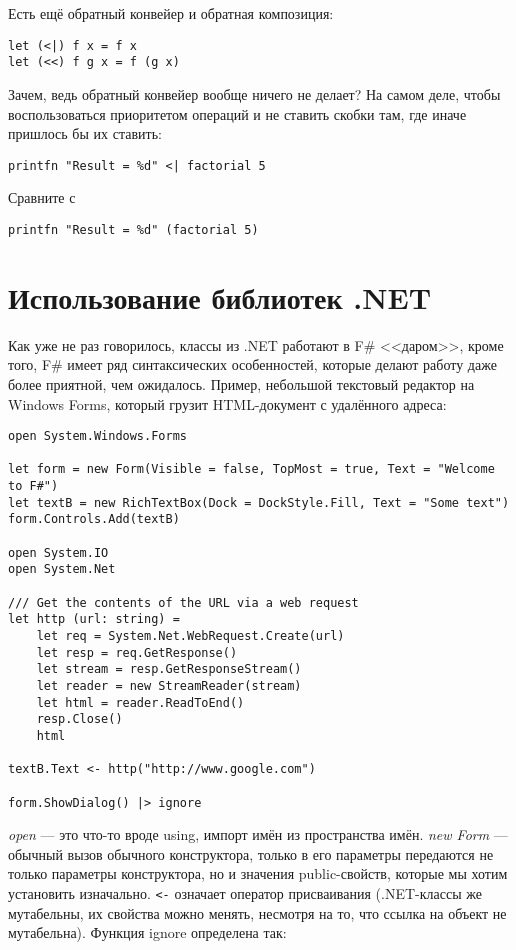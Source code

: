 \documentclass{../../text-style}
\begin{document}
Есть ещё обратный конвейер и обратная композиция:

\begin{verbatim}
let (<|) f x = f x
let (<<) f g x = f (g x)
\end{verbatim}

Зачем, ведь обратный конвейер вообще ничего не делает? На самом деле, чтобы воспользоваться приоритетом операций и не ставить скобки там, где иначе пришлось бы их ставить:

\begin{verbatim}
printfn "Result = %d" <| factorial 5
\end{verbatim}

Сравните с

\begin{verbatim}
printfn "Result = %d" (factorial 5)
\end{verbatim}

\section{Использование библиотек .NET}

Как уже не раз говорилось, классы из .NET работают в F\# <<даром>>, кроме того, F\# имеет ряд синтаксических особенностей, которые делают работу даже более приятной, чем ожидалось. Пример, небольшой текстовый редактор на Windows Forms, который грузит HTML-документ с удалённого адреса:

\begin{verbatim}
open System.Windows.Forms

let form = new Form(Visible = false, TopMost = true, Text = "Welcome to F#")
let textB = new RichTextBox(Dock = DockStyle.Fill, Text = "Some text")
form.Controls.Add(textB)

open System.IO
open System.Net

/// Get the contents of the URL via a web request
let http (url: string) =
    let req = System.Net.WebRequest.Create(url)
    let resp = req.GetResponse()
    let stream = resp.GetResponseStream()
    let reader = new StreamReader(stream)
    let html = reader.ReadToEnd()
    resp.Close()
    html

textB.Text <- http("http://www.google.com")

form.ShowDialog() |> ignore
\end{verbatim}

\textit{open} --- это что-то вроде using, импорт имён из пространства имён. \textit{new Form} --- обычный вызов обычного конструктора, только в его параметры передаются не только параметры конструктора, но и значения public-свойств, которые мы хотим установить изначально. \verb|<-| означает оператор присваивания (.NET-классы же мутабельны, их свойства можно менять, несмотря на то, что ссылка на объект не мутабельна). Функция ignore определена так:
\end{document}
